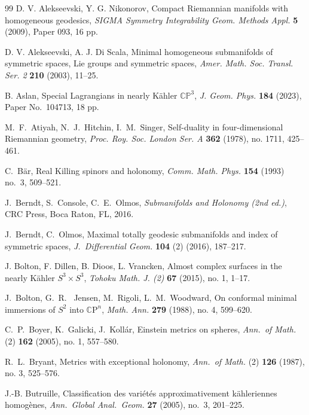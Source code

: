 \documentclass[11pt,a4paper,final]{amsart}
\newcommand{\C}{\mathbb{C}}
\theoremstyle{definition}
\begin{document}
\begin{thebibliography}{99}
	D. V. Alekseevski, Y. G. Nikonorov, Compact Riemannian manifolds with homogeneous geodesics, \textit{SIGMA Symmetry Integrability Geom. Methods Appl.} \textbf{5} (2009), Paper 093, 16 pp.

	D. V. Alekseevski, A. J. Di Scala, Minimal homogeneous submanifolds of symmetric spaces, Lie groups and symmetric spaces, \textit{Amer. Math. Soc. Transl. Ser. 2} \textbf{210} (2003), 11--25.
	
	B. Aslan, Special Lagrangians in nearly Kähler $\C\mathbb{P}^{3}$, \textit{J. Geom. Phys.} \textbf{184} (2023), Paper No.~104713, 18 pp. 

	M.~F.~Atiyah, N.~J.~Hitchin, I.~M.~Singer,  Self-duality in four-dimensional Riemannian geometry, \textit{ Proc. Roy. Soc. London Ser. A} \textbf{362} (1978), no. 1711, 425--461.

	C.~Bär,  Real Killing spinors and holonomy, \textit{Comm. Math. Phys.} \textbf{154} (1993) no.~3, 509--521.

	J.~Berndt, S.~Console, C.~E.~Olmos, \textit{Submanifolds and Holonomy (2nd ed.)}, CRC Press, Boca Raton, FL, 2016.
	
	J.~Berndt, C.~Olmos, Maximal totally geodesic submanifolds and index of symmetric spaces, \emph{J.\ Differential Geom.} \textbf{104} (2) (2016), 187--217.

	 J. Bolton, F. Dillen, B. Dioos, L. Vrancken, Almost complex surfaces in the nearly Kähler $S^{3}\times S^{3}$, \textit{Tohoku Math. J. (2)} \textbf{67} (2015), no. 1, 1--17.

	J.~Bolton, G.~R.~ Jensen, M.~Rigoli, L.~M.~Woodward, On conformal minimal immersions of $S^{2}$ into $\C\mathrm{P}^{n}$, \textit{Math. Ann.} \textbf{279} (1988), no. 4, 599--620. 

	C.~P.~Boyer, K.~Galicki, J.~Kollár, Einstein metrics on spheres, \textit{Ann.\ of Math.} (2) \textbf{162} (2005), no. 1, 557--580.

	R.~L.~Bryant, Metrics with exceptional holonomy, \textit{Ann.\ of Math.} (2) \textbf{126} (1987), no. 3, 525--576.

	J.-B. Butruille, Classification des variétés approximativement kähleriennes homogènes, \textit{Ann.\ Global Anal.\ Geom.} \textbf{27} (2005), no.~3, 201--225. 


\end{thebibliography}
\end{document}
